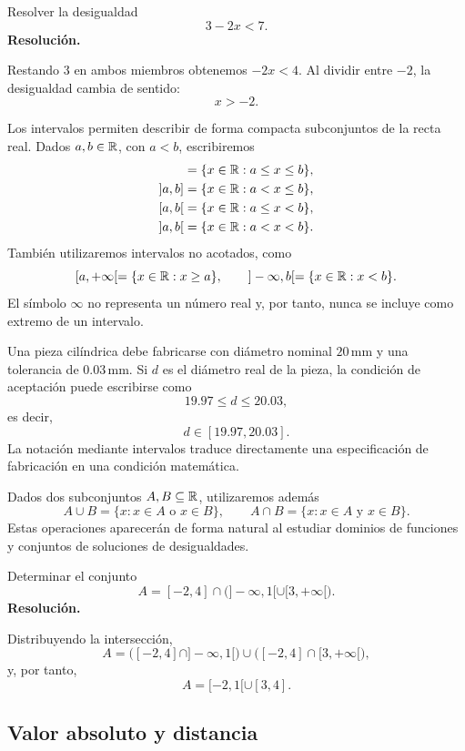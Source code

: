 \begin{example}
Resolver la desigualdad
\[
3-2x<7.
\]
\tcblower
\textbf{Resolución.}\par\smallskip
Restando \(3\) en ambos miembros obtenemos \(-2x<4\). Al dividir entre \(-2\), la desigualdad cambia de sentido:
\[
x>-2.
\]
\end{example}

Los intervalos permiten describir de forma compacta subconjuntos de la recta real. Dados \(a,b\in\mathbb{R}\), con \(a<b\), escribiremos
\begin{align*}
[a,b]&=\{x\in\R:a\leq x\leq b\},\\
]a,b]&=\{x\in\R:a<x\leq b\},\\
[a,b[&=\{x\in\R:a\leq x<b\},\\
]a,b[&=\{x\in\R:a<x<b\}.
\end{align*}
También utilizaremos intervalos no acotados, como
\[
[a,+\infty[=\{x\in\mathbb{R}:x\geq a\},
\qquad
]-\infty,b[=\{x\in\mathbb{R}:x<b\}.
\]
El símbolo \(\infty\) no representa un número real y, por tanto, nunca se incluye como extremo de un intervalo.

\begin{example}
Una pieza cilíndrica debe fabricarse con diámetro nominal \(20\,\mathrm{mm}\) y una tolerancia de \(0.03\,\mathrm{mm}\). Si \(d\) es el diámetro real de la pieza, la condición de aceptación puede escribirse como
\[
19.97\leq d\leq20.03,
\]
es decir,
\[
d\in[19.97,20.03].
\]
La notación mediante intervalos traduce directamente una especificación de fabricación en una condición matemática.
\end{example}

Dados dos subconjuntos \(A,B\subseteq\mathbb{R}\), utilizaremos además
\[
A\cup B=\{x:x\in A\text{ o }x\in B\},
\qquad
A\cap B=\{x:x\in A\text{ y }x\in B\}.
\]
Estas operaciones aparecerán de forma natural al estudiar dominios de funciones y conjuntos de soluciones de desigualdades.

\begin{solvedexercise}
Determinar el conjunto
\[
A=[-2,4]\cap\bigl(]-\infty,1[\cup[3,+\infty[\bigr).
\]
\tcblower
\textbf{Resolución.}\par\smallskip
Distribuyendo la intersección,
\[
A=\bigl([-2,4]\cap]-\infty,1[\bigr)\cup
\bigl([-2,4]\cap[3,+\infty[\bigr),
\]
y, por tanto,
\[
A=[-2,1[\cup[3,4].
\]
\end{solvedexercise}

\subsection{Valor absoluto y distancia}

